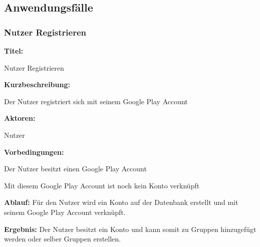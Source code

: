 \documentclass{scrartcl}
\begin{document}
	\subsection{Anwendungsfälle}
	\subsubsection{Nutzer Registrieren}
	\begin{description}
		\item \textbf{Titel:}
		\begin{description}
			\item Nutzer Registrieren
		\end{description}
		\item \textbf{Kurzbeschreibung:}
		\begin{description}
			\item Der Nutzer registriert sich mit seinem Google Play Account
		\end{description}
		\item \textbf{Aktoren:}
		\begin{description}
			\item Nutzer 
		\end{description}
		\item \textbf{Vorbedingungen:}
		\begin{description}
			\item Der Nutzer besitzt einen Google Play Account
			\item Mit diesem Google Play Account ist noch kein Konto verknüpft
		\end{description}
		\item \textbf{Ablauf:} \newline Für den Nutzer wird ein Konto auf der Datenbank erstellt und mit seinem Google Play Account verknüpft.
		\item \textbf{Ergebnis:} \newline Der Nutzer besitzt ein Konto und kann somit zu Gruppen hinzugefügt werden oder selber Gruppen erstellen.
	\end{description}

	\newpage
	
\end{document}
